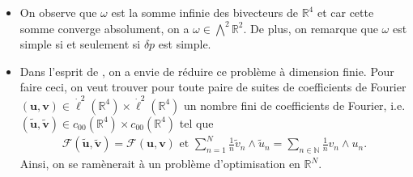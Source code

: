 \documentclass[12pt,a4paper]{article}
\theoremstyle{plain}
\theoremstyle{plain}
\theoremstyle{plain}
\theoremstyle{definition}
\theoremstyle{definition}
\theoremstyle{definition}
\theoremstyle{plain}
\newcommand{\N}{\mathbb{N}}
\newcommand{\R}{\mathbb{R}}
\begin{document}
\begin{itemize}
\item On observe que $\omega$ est la somme infinie des bivecteurs de $\R^4$ et car cette somme converge absolument, on a $\omega \in \bigwedge^2\R^2$. De plus, on remarque que $\omega$ est simple si et seulement si $\delta p$ est simple.

\item Dans l'esprit de \cite{Alouges2017}, on a envie de réduire ce problème à dimension finie. Pour faire ceci, on veut trouver pour toute paire de suites de coefficients de Fourier $(\mathbf{u}, \mathbf{v}) \in \dot{\ell}^2(\R^4) \times \dot{\ell}^2(\R^4)$ un nombre fini de coefficients de Fourier, i.e. $(\mathbf{\tilde{u}}, \mathbf{\tilde{v}}) \in c_{00}(\R^4) \times c_{00}(\R^4)$ tel  que
\begin{align}
	\mathcal{F}(\mathbf{\tilde{u}}, \mathbf{\tilde{v}}) = \mathcal{F}(\mathbf{u}, \mathbf{v}) \text{ et }  \sum_{n = 1}^{N} \frac{1}{n} \tilde{v}_n \wedge \tilde{u}_n = \sum_{n \in \N} \frac{1}{n} v_n \wedge u_n.
\end{align}
Ainsi, on se ramènerait à un problème d'optimisation en $\R^N$.
\end{itemize}
\end{document}

